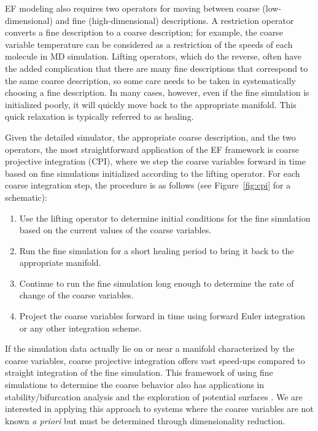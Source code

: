 \documentclass[12pt]{article}
\begin{document}
EF modeling also requires two operators for moving between coarse (low-dimensional) and fine (high-dimensional) descriptions. A restriction operator converts a fine description to a coarse description; for example, the coarse variable temperature can be considered as a restriction of the speeds of each molecule in MD simulation. Lifting operators, which do the reverse, often have the added complication that there are many fine descriptions that correspond to the same coarse description, so some care needs to be taken in systematically choosing a fine description. In many cases, however, even if the fine simulation is initialized poorly, it will quickly move back to the appropriate manifold. This quick relaxation is typically referred to as healing. \vspace{1mm}

Given the detailed simulator, the appropriate coarse description, and the two operators, the most straightforward application of the EF framework is coarse projective integration (CPI), where we step the coarse variables forward in time based on fine simulations initialized according to the lifting operator. For each coarse integration step, the procedure is as follows (see Figure~\ref{fig:cpi} for a schematic):  \vspace{1mm}

\begin{enumerate}
\item Use the lifting operator to determine initial conditions for the fine simulation based on the current values of the coarse variables.
\item Run the fine simulation for a short healing period to bring it back to the appropriate manifold.
\item Continue to run the fine simulation long enough to determine the rate of change of the coarse variables.
\item Project the coarse variables forward in time using forward Euler integration or any other integration scheme.
\end{enumerate}

If the simulation data actually lie on or near a manifold characterized by the coarse variables, coarse projective integration offers vast speed-ups compared to straight integration of the fine simulation. This framework of using fine simulations to determine the coarse behavior also has applications in stability/bifurcation analysis \cite{Theodoropoulos2000, Gear2002} and the exploration of potential surfaces \cite{Frewen2009}. We are interested in applying this approach to systems where the coarse variables are not known \textit{a priori} but must be determined through dimensionality reduction. \vspace{1mm}
\end{document}
